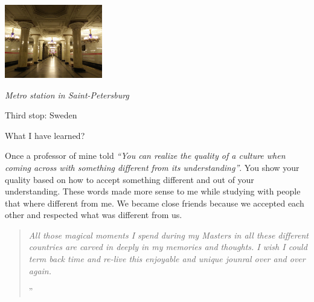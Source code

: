 \documentclass[10pt,a4paper]{article} %
\newcommand{\NewsItem}[1]{ %
\usefont{T1}{fvs}{n}{n} %
\vspace{24pt}\large #1\vspace{3pt} %
\par \normalsize \normalfont}
\begin{document}
\begin{multicols}{3}


\begin{center}
	\includegraphics[width=0.32\textwidth]{media/spb_metro_station.jpg}
	\par\textit{Metro station in Saint-Petersburg}
\end{center}


\NewsItem{Third stop: Sweden}




\NewsItem{What I have learned?}

Once a professor of mine told \textit{``You can realize the 
	quality of a culture when coming across with something different 
	from its understanding''}. 
You show your quality based on how to accept something different and 
out of your understanding.
These words made more sense to me while studying with people that where different 
from me. 
We became close friends because we accepted each other and respected what was 
different from us. 
 




\begin{quotation} %

\noindent\normalsize\textit{All those magical moments I spend during my 
	Masters in all these different countries are carved in deeply in my 
	memories and thoughts. 
	I wish I could term back time and re-live this enjoyable and unique 
	jounral over and over again.
}

\hfill{\Huge''}

\end{quotation}


\end{multicols}
\end{document}
